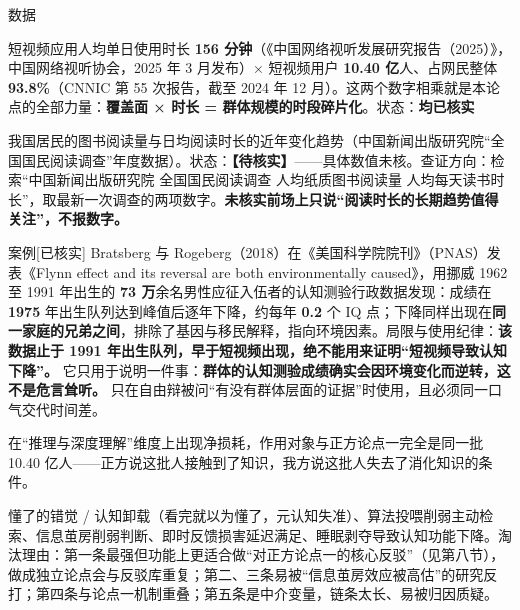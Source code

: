 \documentclass[prep,both]{debate}
\begin{document}
\begin{fields}
\begin{evidence}{数据}
\end{evidence}
\begin{bullets}
\item 短视频应用人均单日使用时长 \textbf{156 分钟}（《中国网络视听发展研究报告（2025）》，中国网络视听协会，2025 年 3 月发布）× 短视频用户 \textbf{10.40 亿}人、占网民整体 \textbf{93.8\%}（CNNIC 第 55 次报告，截至 2024 年 12 月）。这两个数字相乘就是本论点的全部力量：\textbf{覆盖面 × 时长 = 群体规模的时段碎片化}。状态：\textbf{均已核实}
\item 我国居民的图书阅读量与日均阅读时长的近年变化趋势（中国新闻出版研究院“全国国民阅读调查”年度数据）。状态：\textbf{【待核实】}——具体数值未核。查证方向：检索“中国新闻出版研究院 全国国民阅读调查 人均纸质图书阅读量 人均每天读书时长”，取最新一次调查的两项数字。\textbf{未核实前场上只说“阅读时长的长期趋势值得关注”，不报数字。}
\end{bullets}
\begin{evidence}{案例}[已核实]
Bratsberg 与 Rogeberg（2018）在《美国科学院院刊》（PNAS）发表《Flynn effect and its reversal are both environmentally caused》，用挪威 1962 至 1991 年出生的 \textbf{73 万}余名男性应征入伍者的认知测验行政数据发现：成绩在 \textbf{1975} 年出生队列达到峰值后逐年下降，约每年 \textbf{0.2} 个 IQ 点；下降同样出现在\textbf{同一家庭的兄弟之间}，排除了基因与移民解释，指向环境因素。局限与使用纪律：\textbf{该数据止于 1991 年出生队列，早于短视频出现，绝不能用来证明“短视频导致认知下降”。} 它只用于说明一件事：\textbf{群体的认知测验成绩确实会因环境变化而逆转，这不是危言耸听。} 只在自由辩被问“有没有群体层面的证据”时使用，且必须同一口气交代时间差。
\end{evidence}
\closing[回扣判准]{在“推理与深度理解”维度上出现净损耗，作用对象与正方论点一完全是同一批 10.40 亿人——正方说这批人接触到了知识，我方说这批人失去了消化知识的条件。}
\begin{clash}
\end{clash}
\end{fields}
懂了的错觉 / 认知卸载（看完就以为懂了，元认知失准）、算法投喂削弱主动检索、信息茧房削弱判断、即时反馈损害延迟满足、睡眠剥夺导致认知功能下降。淘汰理由：第一条最强但功能上更适合做“对正方论点一的核心反驳”（见第八节），做成独立论点会与反驳库重复；第二、三条易被“信息茧房效应被高估”的研究反打；第四条与论点一机制重叠；第五条是中介变量，链条太长、易被归因质疑。
\end{document}
